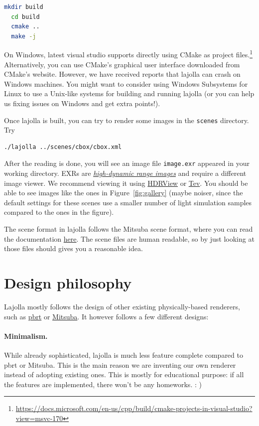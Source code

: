 \documentclass{article}
\begin{document}
\begin{lstlisting}[language=bash]
  mkdir build
  cd build
  cmake ..
  make -j
\end{lstlisting}

On Windows, latest visual studio supports directly using CMake as project files.\footnote{\url{https://docs.microsoft.com/en-us/cpp/build/cmake-projects-in-visual-studio?view=msvc-170}} Alternatively, you can use CMake's graphical user interface downloaded from CMake's website. However, we have received reports that lajolla can crash on Windows machines. You might want to consider using Windows Subsystems for Linux to use a Unix-like systems for building and running lajolla (or you can help us fixing issues on Windows and get extra points!). 

Once lajolla is built, you can try to render some images in the \lstinline{scenes} directory. Try
\begin{lstlisting}[language=bash]
  ./lajolla ../scenes/cbox/cbox.xml
\end{lstlisting}

After the reading is done, you will see an image file \lstinline{image.exr} appeared in your working directory. EXRs are \href{https://en.wikipedia.org/wiki/High_dynamic_range}{\emph{high-dynamic range images}} and require a different image viewer. We recommend viewing it using \href{https://github.com/wkjarosz/hdrview}{HDRView} or \href{https://github.com/Tom94/tev}{Tev}. You should be able to see images like the ones in Figure~\ref{fig:gallery} (maybe noiser, since the default settings for these scenes use a smaller number of light simulation samples compared to the ones in the figure).

The scene format in lajolla follows the Mitsuba scene format, where you can read the documentation \href{https://www.mitsuba-renderer.org/releases/current/documentation.pdf}{here}. The scene files are human readable, so by just looking at those files should gives you a reasonable idea.

\section{Design philosophy}

Lajolla mostly follows the design of other existing physically-based renderers, such as \href{https://github.com/mmp/pbrt-v3/}{pbrt} or \href{http://www.mitsuba-renderer.org/}{Mitsuba}. It however follows a few different designs:

\paragraph{Minimalism.} While already sophisticated, lajolla is much less feature complete compared to pbrt or Mitsuba. This is the main reason we are inventing our own renderer instead of adopting existing ones. This is mostly for educational purpose: if all the features are implemented, there won't be any homeworks. : )
\end{document}
